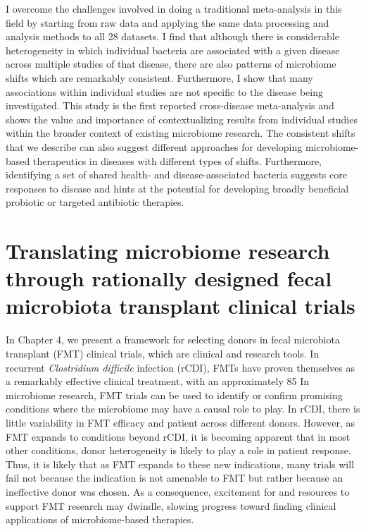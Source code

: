 I overcome the challenges involved in doing a traditional meta-analysis in this field by starting from raw data and applying the same data processing and analysis methods to all 28 datasets.
I find that although there is considerable heterogeneity in which individual bacteria are associated with a given disease across multiple studies of that disease, there are also patterns of microbiome shifts which are remarkably consistent.
Furthermore, I show that many associations within individual studies are not specific to the disease being investigated.
This study is the first reported cross-disease meta-analysis and shows the value and importance of contextualizing results from individual studies within the broader context of existing microbiome research.
The consistent shifts that we describe can also suggest different approaches for developing microbiome-based therapeutics in diseases with different types of shifts.
Furthermore, identifying a set of shared health- and disease-associated bacteria suggests core responses to disease and hints at the potential for developing broadly beneficial probiotic or targeted antibiotic therapies.

\section{Translating microbiome research through rationally designed fecal microbiota transplant clinical trials}

In Chapter 4, we present a framework for selecting donors in fecal microbiota transplant (FMT) clinical trials, which are clinical and research tools.
In recurrent \textit{Clostridium difficile} infection (rCDI), FMTs have proven themselves as a remarkably effective clinical treatment, with an approximately 85%
In microbiome research, FMT trials can be used to identify or confirm promising conditions where the microbiome may have a causal role to play.
In rCDI, there is little variability in FMT efficacy and patient across different donors.
However, as FMT expands to conditions beyond rCDI, it is becoming apparent that in most other conditions, donor heterogeneity is likely to play a role in patient response.
Thus, it is likely that as FMT expands to these new indications, many trials will fail not because the indication is not amenable to FMT but rather because an ineffective donor was chosen.
As a consequence, excitement for and resources to support FMT research may dwindle, slowing progress toward finding clinical applications of microbiome-based therapies.

